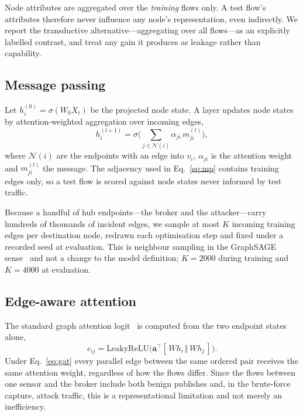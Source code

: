 Node attributes are aggregated over the \emph{training} flows only. A test
flow's attributes therefore never influence any node's representation, even
indirectly. We report the transductive alternative---aggregating over all
flows---as an explicitly labelled contrast, and treat any gain it produces as
leakage rather than capability.

\subsection{Message passing}

Let $h_i^{(0)} = \sigma(W_0 X_i)$ be the projected node state. A layer updates
node states by attention-weighted aggregation over incoming edges,
\begin{equation}
h_i^{(l+1)} = \sigma\!\Big( \sum_{j \in \mathcal{N}(i)}
   \alpha_{ji}\, m_{ji}^{(l)} \Big),
\label{eq:mp}
\end{equation}
where $\mathcal{N}(i)$ are the endpoints with an edge into $v_i$,
$\alpha_{ji}$ is the attention weight and $m_{ji}^{(l)}$ the message. The
adjacency used in Eq.~\eqref{eq:mp} contains training edges only, so a test
flow is scored against node states never informed by test traffic.

Because a handful of hub endpoints---the broker and the attacker---carry
hundreds of thousands of incident edges, we sample at most $K$ incoming
training edges per destination node, redrawn each optimisation step and fixed
under a recorded seed at evaluation. This is neighbour sampling in the
GraphSAGE sense~\cite{hamilton2017graphsage} and not a change to the model
definition; $K = 2000$ during training and $K = 4000$ at evaluation.

\subsection{Edge-aware attention}

The standard graph attention logit~\cite{velickovic2018gat} is computed from
the two endpoint states alone,
\begin{equation}
e_{ij} = \mathrm{LeakyReLU}\big(\mathbf{a}^{\top}
  [\,W h_i \,\Vert\, W h_j\,]\big).
\label{eq:gat}
\end{equation}
Under Eq.~\eqref{eq:gat} every parallel edge between the same ordered pair
receives the same attention weight, regardless of how the flows differ. Since
the flows between one sensor and the broker include both benign publishes and,
in the brute-force capture, attack traffic, this is a representational
limitation and not merely an inefficiency.

